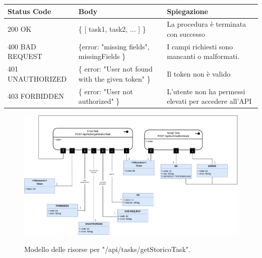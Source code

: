 \documentclass{report}
\begin{document}
\begin{center} %
	\centering
	\begin{tabular}{ |p{4cm}|p{4cm}|p{4cm}| }
		\hline
		\centering Status Code & \qquad\qquad\quad Body & \qquad\quad Spiegazione\\ %
		\hline
		200 OK & \{ [ task1, task2, ... ] \}  & La procedura è terminata con successo	\\ 
		\hline
		400 BAD REQUEST & \{error: "missing fields", missingFields \} & I campi richiesti sono mancanti o malformati. \\
		\hline
		401 UNAUTHORIZED & \{ error: "User not found with the given token" \} & Il token non è valido \\
		\hline
		403 FORBIDDEN & \{ error: "User not authorized" \} &  L'utente non ha permessi elevati per accedere all'API \\
		\hline
	\end{tabular}
\end{center}


\begin{figure}[H]
	\centering\includegraphics[width=1\textwidth]{images/model_storico_task.png}
	
	Modello delle risorse per "/api/tasks/getStoricoTask".
\end{figure}
\end{document}
